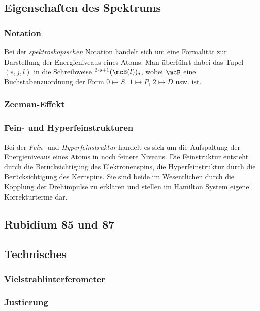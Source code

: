 \documentclass[../main.tex]{subfiles}
\begin{document}
    \subsection{Eigenschaften des Spektrums}
        \subsubsection*{Notation}
            Bei der \emph{spektroskopischen} Notation handelt sich um eine Formalität zur Darstellung der Energieniveaus eines Atoms. Man überführt dabei das Tupel $(s,j,l)$ in die Schreibweise $^{2\cdot s + 1}(\mcB(l))_j$, wobei $\mcB$ eine Buchstabenzuordnung der Form $0\mapsto S$, $1\mapsto P$, $2\mapsto D$ usw. ist. 

        \subsubsection*{Zeeman-Effekt}

            
			

        \subsubsection*{Fein- und Hyperfeinstrukturen}
            Bei der \emph{Fein-} und \emph{Hyperfeinstruktur} handelt es sich um die Aufspaltung der Energieniveaus eines Atoms in noch feinere Niveaus. Die Feinstruktur entsteht durch die Berücksichtigung des Elektronenspins, die Hyperfeinstruktur durch die Berücksichtigung des Kernspins. Sie sind beide im Wesentlichen durch die Kopplung der Drehimpulse zu erklären und stellen im Hamilton System eigene Korrekturterme dar. 

    \subsection{Rubidium 85 und 87}


    \subsection{Technisches}
        \subsubsection*{Vielstrahlinterferometer}
            
        \subsubsection*{Justierung}
\end{document}
